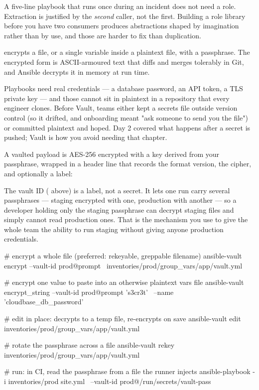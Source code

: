  A five-line playbook that runs once during an incident does not need a role. Extraction is justified by the \emph{second} caller, not the first. Building a role library before you have two consumers produces abstractions shaped by imagination rather than by use, and those are harder to fix than duplication.


  encrypts a file, or a single variable inside a plaintext file, with a passphrase. The encrypted form is ASCII-armoured text that diffs and merges tolerably in Git, and Ansible decrypts it in memory at run time.

 Playbooks need real credentials --- a database password, an API token, a TLS private key --- and those cannot sit in plaintext in a repository that every engineer clones. Before Vault, teams either kept a secrets file outside version control (so it drifted, and onboarding meant "ask someone to send you the file") or committed plaintext and hoped. Day 2 covered what happens after a secret is pushed; Vault is how you avoid needing that chapter.

 A vaulted payload is AES-256 encrypted with a key derived from your passphrase, wrapped in a header line that records the format version, the cipher, and optionally a  label:


The vault ID ( above) is a label, not a secret. It lets one run carry several passphrases --- staging encrypted with one, production with another --- so a developer holding only the staging passphrase can decrypt staging files and simply cannot read production ones. That is the mechanism you use to give the whole team the ability to run staging without giving anyone production credentials.

\begin{bashbox}
# encrypt a whole file (preferred: rekeyable, greppable filename)
ansible-vault encrypt --vault-id prod@prompt \
  inventories/prod/group_vars/app/vault.yml

# encrypt one value to paste into an otherwise plaintext vars file
ansible-vault encrypt_string --vault-id prod@prompt 's3cr3t' \
  --name 'cloudbase_db_password'

# edit in place: decrypts to a temp file, re-encrypts on save
ansible-vault edit inventories/prod/group_vars/app/vault.yml

# rotate the passphrase across a file
ansible-vault rekey inventories/prod/group_vars/app/vault.yml

# run: in CI, read the passphrase from a file the runner injects
ansible-playbook -i inventories/prod site.yml \
  --vault-id prod@/run/secrets/vault-pass
\end{bashbox}

